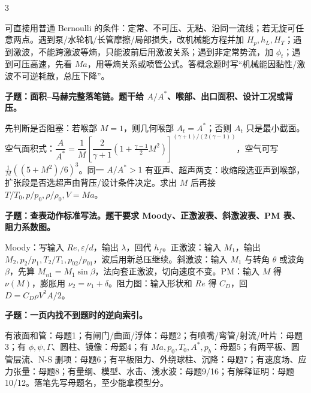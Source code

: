 \documentclass[a4paper]{article}
\newcommand{\qt}[1]{\vspace{0.04pt}\colorbox{Q}{\parbox{\dimexpr\linewidth-2\fboxsep}{\color{white}\bfseries #1}}\par}
\newcommand{\ans}[1]{\colorbox{G}{\parbox{\dimexpr\linewidth-2\fboxsep}{#1}}\par}
\begin{document}
\begin{multicols}{3}
\ans{可直接用普通 Bernoulli 的条件：定常、不可压、无粘、沿同一流线；若无旋可任意两点。遇到泵/水轮机/长管摩擦/局部损失，改机械能方程并加 $H_p,h_L,H_T$；遇到激波，不能跨激波等熵，只能波前后用激波关系；遇到非定常势流，加 $\phi_t$；遇到可压高速，先看 $Ma$，用等熵关系或喷管公式。答概念题时写“机械能因黏性/激波不可逆耗散，总压下降”。}
\qt{子题：面积--马赫完整落笔链。题干给 $A/A^*$、喉部、出口面积、设计工况或背压。}
\ans{先判断是否阻塞：若喉部 $M=1$，则几何喉部 $A_t=A^*$；否则 $A_t$ 只是最小截面。空气面积式：$\dfrac{A}{A^*}=\dfrac1M\left[\dfrac{2}{\gamma+1}(1+\frac{\gamma-1}{2}M^2)\right]^{(\gamma+1)/(2(\gamma-1))}$，空气可写 $\frac1M((5+M^2)/6)^3$。同一 $A/A^*>1$ 有亚声、超声两支：收缩段选亚声到喉部，扩张段是否选超声由背压/设计条件决定。求出 $M$ 后再接 $T/T_0,p/p_0,\rho/\rho_0,V=Ma$。}
\qt{子题：查表动作标准写法。题干要求 Moody、正激波表、斜激波表、PM 表、阻力系数图。}
\ans{Moody：写输入 $Re,\varepsilon/d$，输出 $\lambda$，回代 $h_f$。正激波：输入 $M_1$，输出 $M_2,p_2/p_1,T_2/T_1,p_{02}/p_{01}$，波后用新总压继续。斜激波：输入 $M_1$ 与转角 $\theta$ 或波角 $\beta$，先算 $M_{n1}=M_1\sin\beta$，法向套正激波，切向速度不变。PM：输入 $M$ 得 $\nu(M)$，膨胀用 $\nu_2=\nu_1+\delta$。阻力图：输入形状和 $Re$ 得 $C_D$，回 $D=C_D\rho V^2A/2$。}
\qt{子题：一页内找不到题时的逆向索引。}
\ans{有液面和管：母题1；有闸门/曲面/浮体：母题2；有喷嘴/弯管/射流/叶片：母题3；有 $\phi,\psi,\Gamma$、圆柱、镜像：母题4；有 $Ma,p_0,T_0,A^*,p_b$：母题5；有两平板、圆管层流、N-S 删项：母题6；有平板阻力、外绕球柱、沉降：母题7；有速度场、应力张量：母题8；有量纲、模型、水击、浅水波：母题9/16；有解释证明：母题10/12。落笔先写母题名，至少能拿模型分。}


\end{multicols}
\end{document}
